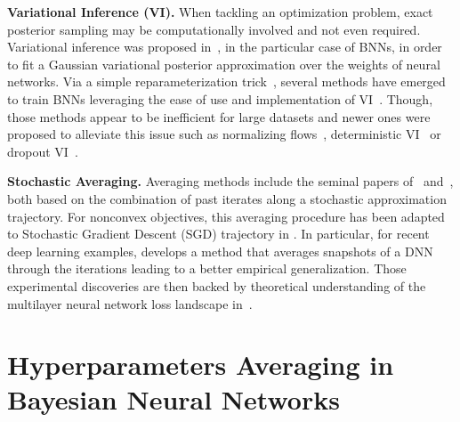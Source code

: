 \documentclass[tablecaption=bottom,wcp]{jmlr}
\begin{document}
\vspace{0.08in}
\noindent \textbf{Variational Inference (VI).}
When tackling an optimization problem, exact posterior sampling may be computationally involved and not even required.
Variational inference was proposed in~\citep{graves2011practical}, in the particular case of BNNs, in order to fit a Gaussian variational posterior approximation over the weights of neural networks.
Via a simple reparameterization trick~\citep{blundell2015weight}, several methods have emerged to train BNNs leveraging the ease of use and implementation of VI~\citep{kingma2015variational,blundell2015weight,molchanov2017variational}.
Though, those methods appear to be inefficient for large datasets and newer ones were proposed to alleviate this issue such as normalizing flows~\citep{louizos2017multiplicative}, deterministic VI~\citep{wu2018deterministic} or dropout VI~\citep{gal2016dropout}.

\vspace{0.08in}
\noindent \textbf{Stochastic Averaging.}
Averaging methods include the seminal papers of~\citep{polyak1990sa} and~\citep{ruppert1988efficient}, both based on the combination of past iterates along a stochastic approximation trajectory.
For nonconvex objectives, this averaging procedure has been adapted to Stochastic Gradient Descent (SGD) trajectory in \citep{zhou2017convergence}.
In particular, for recent deep learning examples, \citet{izmailov2018averaging} develops a  method that averages snapshots of a DNN through the iterations leading to a better empirical generalization.
Those experimental discoveries are then backed by theoretical understanding of the multilayer neural network loss landscape in~\citep{keskar2016large,he2019asymmetric}.


\section{Hyperparameters Averaging in Bayesian Neural Networks}\label{sec:main}
\end{document}
